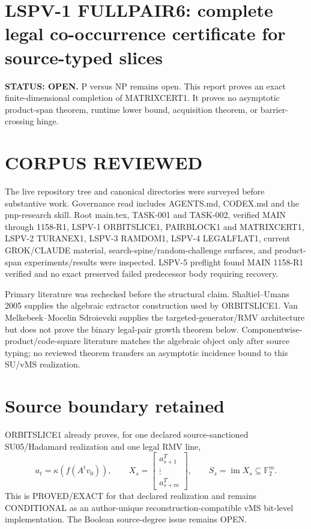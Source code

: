 \documentclass[11pt]{article}
\begin{document}
\section*{LSPV-1 FULLPAIR6: complete legal co-occurrence certificate for source-typed slices}
\textbf{STATUS: OPEN.} P versus NP remains open. This report proves an exact finite-dimensional completion of MATRIXCERT1. It proves no asymptotic product-span theorem, runtime lower bound, acquisition theorem, or barrier-crossing hinge.

\section*{CORPUS REVIEWED}
The live repository tree and canonical directories were surveyed before substantive work. Governance read includes AGENTS.md, CODEX.md and the pnp-research skill. Root main.tex, TASK-001 and TASK-002, verified MAIN through 1158-R1, LSPV-1 ORBITSLICE1, PAIRBLOCK1 and MATRIXCERT1, LSPV-2 TURANEX1, LSPV-3 RAMDOM1, LSPV-4 LEGALFLAT1, current GROK/CLAUDE material, search-spine/random-challenge surfaces, and product-span experiments/results were inspected. LSPV-5 preflight found MAIN 1158-R1 verified and no exact preserved failed predecessor body requiring recovery.

Primary literature was rechecked before the structural claim. Shaltiel--Umans 2005 supplies the algebraic extractor construction used by ORBITSLICE1. Van Melkebeek--Mocelin Sdroievski supplies the targeted-generator/RMV architecture but does not prove the binary legal-pair growth theorem below. Componentwise-product/code-square literature matches the algebraic object only after source typing; no reviewed theorem transfers an asymptotic incidence bound to this SU/vMS realization.

\section*{Source boundary retained}
ORBITSLICE1 already proves, for one declared source-sanctioned SU05/Hadamard realization and one legal RMV line,
\[
a_t=\kappa(f(A^tv_0)),\qquad
X_s=
\begin{bmatrix}
a_{s+1}^{T}\\ \vdots\\ a_{s+m}^{T}
\end{bmatrix},\qquad
S_s=\operatorname{im}X_s\subseteq\mathbb F_2^m.
\]
This is PROVED/EXACT for that declared realization and remains CONDITIONAL as an author-unique reconstruction-compatible vMS bit-level implementation. The Boolean source-degree issue remains OPEN.
\end{document}
